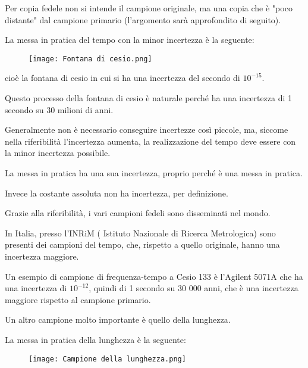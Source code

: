 Per copia fedele non si intende il campione originale, ma una copia che è "poco distante" dal campione primario (l'argomento sarà approfondito di seguito). \newline 

La messa in pratica del tempo con la minor incertezza è la seguente: 

\begin{figure}[h]
    \centering
    \texttt{[image: Fontana di cesio.png]}
\end{figure}

cioè la fontana di cesio in cui si ha una incertezza del secondo di $10^{-15}$. \newline 

Questo processo della fontana di cesio è naturale perché ha una incertezza di 1 secondo su 30 milioni di anni. \newline 

Generalmente non è necessario conseguire incertezze così piccole, ma, siccome nella riferibilità l'incertezza aumenta, 
la realizzazione del tempo deve essere con la minor incertezza possibile. \newline 

La messa in pratica ha una sua incertezza, proprio perché è una messa in pratica. \newline 

Invece la costante assoluta non ha incertezza, per definizione. \newline 

Grazie alla riferibilità, i vari campioni fedeli sono disseminati nel mondo. \newline 

In Italia, presso l'INRiM ( Istituto Nazionale di Ricerca Metrologica) sono presenti dei campioni del tempo, che, rispetto a quello originale, hanno una incertezza maggiore. \newline 

Un esempio di campione di frequenza-tempo a Cesio 133 è l'Agilent 5071A che ha una incertezza di $10^{-12}$, 
quindi di 1 secondo su 30 000 anni, che è una incertezza maggiore rispetto al campione primario. \newline

Un altro campione molto importante è quello della lunghezza. \newline 

La messa in pratica della lunghezza è la seguente: 

\begin{figure}[h]
    \centering
    \texttt{[image: Campione della lunghezza.png]}
\end{figure}


